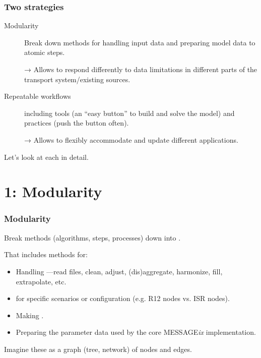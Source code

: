 \documentclass[12pt,aspectratio=169]{beamer}
\begin{document}
\begin{frame}
\frametitle{Two strategies}

\large

\begin{description}
  \item [Modularity] Break down methods for handling input data and preparing model data to atomic steps.

  → Allows to respond differently to data limitations in different parts of the transport system/existing sources.
  \item [Repeatable workflows] including tools (an “easy button” to build and solve the model) and practices (push the button often).

  → Allows to flexibly accommodate and update different applications.
\end{description}

\medskip
\hspace{15mm} Let's look at each in detail.
\end{frame}

\section{1: Modularity}

\begin{frame}
\frametitle{Modularity}

Break methods (algorithms, steps, processes) down into .

\bigskip
That includes methods for:
\begin{itemize}
  \item Handling —read files, clean, adjust, (dis)aggregate, harmonize, fill, extrapolate, etc.
  \item {} for specific scenarios or configuration (e.g. R12 nodes vs. ISR nodes).
  \item Making .
  \item Preparing the parameter data used by the core MESSAGE\emph{ix} implementation.
\end{itemize}

\bigskip
Imagine these as a graph (tree, network) of nodes and edges.
\end{frame}
\end{document}
